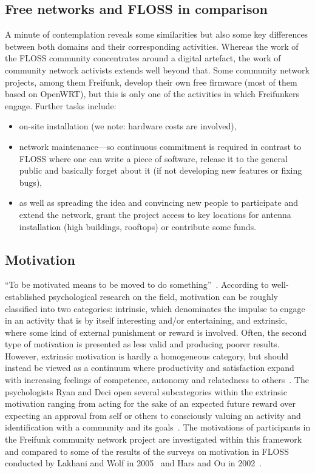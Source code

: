 \subsection{Free networks and FLOSS in comparison}\label{subsec:comparison}
A minute of contemplation reveals some similarities but also some key differences between both domains and their corresponding activities. %
Whereas the work of the FLOSS community concentrates around a digital artefact, the work of community network activists extends well beyond that.
Some community network projects, among them Freifunk, develop their own free firmware (most of them based on OpenWRT), but this is only one of the activities in which Freifunkers engage.
Further tasks include:
\begin{itemize}
  \item on-site installation (we note: hardware costs are involved),
  \item network maintenance---so continuous commitment is required in contrast to FLOSS where one can write a piece of software, release it to the general public and basically forget about it (if not developing new features or fixing bugs),
  \item as well as spreading the idea and convincing new people to participate and extend the network, grant the project access to key locations for antenna installation (high buildings, rooftops) or contribute some funds. %
\end{itemize}

\subsection{Motivation}\label{subsec:motivation}
``To be motivated means to be moved to do something''~\cite{RyDe2000}.
According to well-established psychological research on the field, motivation can be roughly classified into two categories:
intrinsic, which denominates the impulse to engage in an activity that is by itself interesting and/or entertaining,
and extrinsic, where some kind of external punishment or reward is involved.
Often, the second type of motivation is presented as less valid and producing poorer results. %
However, extrinsic motivation is hardly a homogeneous category, but should instead be viewed as a continuum where productivity and satisfaction expand with increasing feelings of competence, autonomy and relatedness to others~\cite{RyDe2000}.
The psychologists Ryan and Deci open several subcategories within the extrinsic motivation ranging from acting for the sake of an expected future reward over expecting an approval from self or others to consciously valuing an activity and identification with a community and its goals~\cite{RyDe2000}.
The motivations of participants in the Freifunk community network project are investigated within this framework and compared to some of the results of the surveys on motivation in FLOSS conducted by Lakhani and Wolf in 2005~\cite{LakWo2005} and Hars and Ou in 2002~\cite{HarOu2002}.


